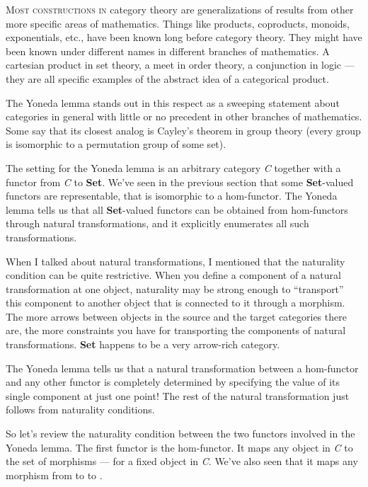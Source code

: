 \lettrine[lhang=0.17]{M}{ost constructions in} category theory are generalizations of results
from other more specific areas of mathematics. Things like products,
coproducts, monoids, exponentials, etc., have been known long before
category theory. They might have been known under different names in
different branches of mathematics. A cartesian product in set theory, a
meet in order theory, a conjunction in logic --- they are all specific
examples of the abstract idea of a categorical product.

The Yoneda lemma stands out in this respect as a sweeping statement
about categories in general with little or no precedent in other
branches of mathematics. Some say that its closest analog is Cayley's
theorem in group theory (every group is isomorphic to a permutation
group of some set).

The setting for the Yoneda lemma is an arbitrary category \emph{C}
together with a functor  from \emph{C} to \textbf{Set}. We've
seen in the previous section that some \textbf{Set}-valued functors are
representable, that is isomorphic to a hom-functor. The Yoneda lemma
tells us that all \textbf{Set}-valued functors can be obtained from
hom-functors through natural transformations, and it explicitly
enumerates all such transformations.

When I talked about natural transformations, I mentioned that the
naturality condition can be quite restrictive. When you define a
component of a natural transformation at one object, naturality may be
strong enough to ``transport'' this component to another object that is
connected to it through a morphism. The more arrows between objects in
the source and the target categories there are, the more constraints you
have for transporting the components of natural transformations.
\textbf{Set} happens to be a very arrow-rich category.

The Yoneda lemma tells us that a natural transformation between a
hom-functor and any other functor  is completely determined by
specifying the value of its single component at just one point! The rest
of the natural transformation just follows from naturality conditions.

So let's review the naturality condition between the two functors
involved in the Yoneda lemma. The first functor is the hom-functor. It
maps any object  in \emph{C} to the set of morphisms
 --- for  a fixed object in \emph{C}. We've
also seen that it maps any morphism  from  to
 to .

